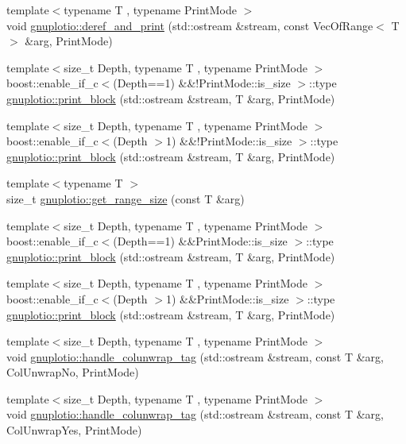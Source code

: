 \begin{DoxyCompactItemize}
{\footnotesize template$<$typename T , typename Print\+Mode $>$ }\\void \hyperlink{namespacegnuplotio_ae768911c8adb77bfc080d5e4561573e6}{gnuplotio\+::deref\+\_\+and\+\_\+print} (std\+::ostream \&stream, const Vec\+Of\+Range$<$ T $>$ \&arg, Print\+Mode)
\item 
{\footnotesize template$<$size\+\_\+t Depth, typename T , typename Print\+Mode $>$ }\\boost\+::enable\+\_\+if\+\_\+c$<$(Depth==1) \&\&!Print\+Mode\+::is\+\_\+size $>$\+::type \hyperlink{namespacegnuplotio_a631368ab4e255d2a5d563a41895f2edc}{gnuplotio\+::print\+\_\+block} (std\+::ostream \&stream, T \&arg, Print\+Mode)
\item 
{\footnotesize template$<$size\+\_\+t Depth, typename T , typename Print\+Mode $>$ }\\boost\+::enable\+\_\+if\+\_\+c$<$(Depth $>$1) \&\&!Print\+Mode\+::is\+\_\+size $>$\+::type \hyperlink{namespacegnuplotio_a753a3551f418723c022be60c12379025}{gnuplotio\+::print\+\_\+block} (std\+::ostream \&stream, T \&arg, Print\+Mode)
\item 
{\footnotesize template$<$typename T $>$ }\\size\+\_\+t \hyperlink{namespacegnuplotio_abb416b68686102ba84a2cb53c96b64e9}{gnuplotio\+::get\+\_\+range\+\_\+size} (const T \&arg)
\item 
{\footnotesize template$<$size\+\_\+t Depth, typename T , typename Print\+Mode $>$ }\\boost\+::enable\+\_\+if\+\_\+c$<$(Depth==1) \&\&Print\+Mode\+::is\+\_\+size $>$\+::type \hyperlink{namespacegnuplotio_ae470a0908ac5f51527ff76ecbc1616d1}{gnuplotio\+::print\+\_\+block} (std\+::ostream \&stream, T \&arg, Print\+Mode)
\item 
{\footnotesize template$<$size\+\_\+t Depth, typename T , typename Print\+Mode $>$ }\\boost\+::enable\+\_\+if\+\_\+c$<$(Depth $>$1) \&\&Print\+Mode\+::is\+\_\+size $>$\+::type \hyperlink{namespacegnuplotio_a94e97ca55dc1e5142dcc4457a5e1dd2d}{gnuplotio\+::print\+\_\+block} (std\+::ostream \&stream, T \&arg, Print\+Mode)
\item 
{\footnotesize template$<$size\+\_\+t Depth, typename T , typename Print\+Mode $>$ }\\void \hyperlink{namespacegnuplotio_aef147f3d42f3f2c89cc4c895b8494150}{gnuplotio\+::handle\+\_\+colunwrap\+\_\+tag} (std\+::ostream \&stream, const T \&arg, Col\+Unwrap\+No, Print\+Mode)
\item 
{\footnotesize template$<$size\+\_\+t Depth, typename T , typename Print\+Mode $>$ }\\void \hyperlink{namespacegnuplotio_a3b8981d3f39de8a058b5f18484f06c3c}{gnuplotio\+::handle\+\_\+colunwrap\+\_\+tag} (std\+::ostream \&stream, const T \&arg, Col\+Unwrap\+Yes, Print\+Mode)

\end{DoxyCompactItemize}
